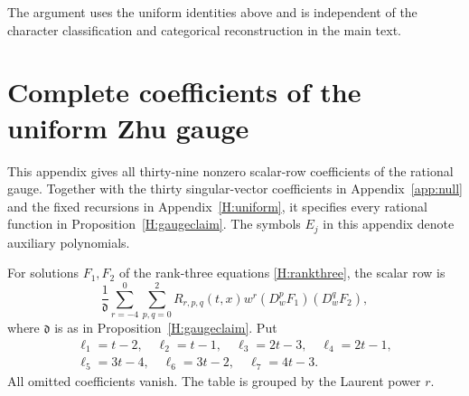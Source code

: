 \documentclass[11pt]{article}
\numberwithin{equation}{section}
\begin{document}
The argument uses the uniform identities above and is independent of the character classification and categorical reconstruction in the main text.

\section{Complete coefficients of the uniform Zhu gauge}\label{H:gauge}
This appendix gives all thirty-nine nonzero scalar-row coefficients of the rational gauge. Together with the thirty singular-vector coefficients in Appendix~\ref{app:null} and the fixed recursions in Appendix~\ref{H:uniform}, it specifies every rational function in Proposition~\ref{H:gaugeclaim}. The symbols $E_j$ in this appendix denote auxiliary polynomials.

For solutions $F_1,F_2$ of the rank-three equations \eqref{H:rankthree}, the scalar row is
\begin{equation}\label{H:scalarrow}
\frac1{\mathfrak d}\sum_{r=-4}^{0}\sum_{p,q=0}^{2}
R_{r,p,q}(t,x)w^r(D_w^pF_1)(D_w^qF_2),
\end{equation}
where $\mathfrak d$ is as in Proposition~\ref{H:gaugeclaim}. Put
\[
\begin{gathered}
\ell_1=t-2,\quad\ell_2=t-1,\quad\ell_3=2t-3,\quad\ell_4=2t-1,\\
\ell_5=3t-4,\quad\ell_6=3t-2,\quad\ell_7=4t-3.
\end{gathered}
\]
All omitted coefficients vanish. The table is grouped by the Laurent power $r$.
\end{document}
